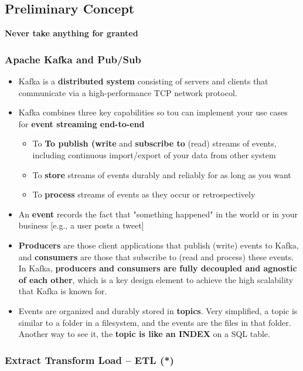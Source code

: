 \subsection{Preliminary Concept}

\textbf{Never take anything for granted}

\subsubsection{Apache Kafka and Pub/Sub}

\begin{itemize}
	\item Kafka is a \textbf{distributed system} consisting of servers and clients that communicate via a high-performance TCP network protocol.
	\item Kafka combines three key capabilities so tou can implement your use cases for \textbf{event streaming end-to-end}
	\begin{itemize}
		\item To \textbf{To publish (write} and \textbf{subscribe to} (read) streams of events, including continuous import/export of your data from other system
		\item To \textbf{store} streams of events durably and reliably for as long as you want
		\item To \textbf{process} streams of events as they occur or retrospectively
	\end{itemize}
	\item An \textbf{event} records the fact that "something happened" in the world or in your business [e.g., a user posts a tweet]
	\item \textbf{Producers} are those client applications that publish (write) events to Kafka, and \textbf{consumers} are those that subscribe to (read and process) these events. In Kafka, \textbf{producers and consumers are fully decoupled and agnostic of each other}, which is a key design element to achieve the high scalability that Kafka is known for.
	\item Events are organized and durably stored in \textbf{topics}. Very simplified, a topic is similar to a folder in a filesystem, and the events are the files in that folder. Another way to see it, the \textbf{topic is like an INDEX} on a SQL table.
\end{itemize}

\subsubsection{Extract Transform Load – ETL (*)}

